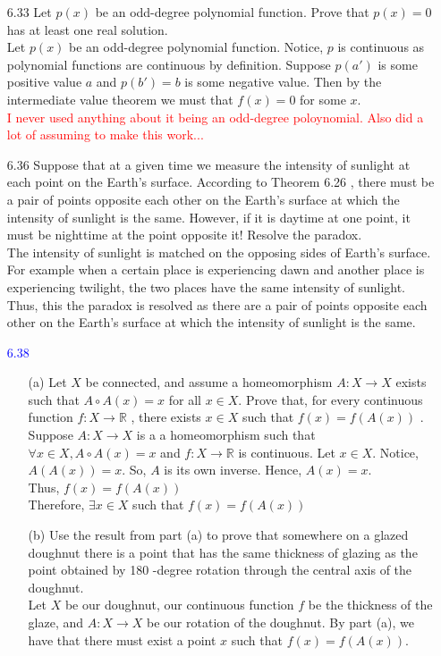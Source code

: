 \documentclass[12pt]{article}
\newcommand{\R}{\mathbb{R}}
\begin{document}
\begin{enumerate}
		\item[6.33] Let $p ( x )$ be an odd-degree polynomial function. Prove that $p ( x ) = 0$ has at least one real solution.\\
		Let $ p(x) $ be an odd-degree polynomial function. Notice, $ p $ is continuous as polynomial functions are continuous by definition. Suppose $ p(a') $ is some positive value $ a $ and $ p(b') = b $ is some negative value. Then by the intermediate value theorem we must that $ f(x)=0 $ for some $ x $.\\
		\textcolor{red}{I never used anything about it being an odd-degree poloynomial. Also did a lot of assuming to make this work...}
		
		\item[6.36] Suppose that at a given time we measure the intensity of sunlight at each point on the Earth's surface. According to Theorem 6.26 , there must be a pair of points
		opposite each other on the Earth's surface at which the intensity of sunlight is the same. However, if it is daytime at one point, it must be nighttime at the
		point opposite it! Resolve the paradox.\\
		The intensity of sunlight is matched on the opposing sides of Earth's surface. For example when a certain place is experiencing dawn and another place is experiencing twilight, the two places have the same intensity of sunlight. Thus, this the paradox is resolved as there are a pair of points opposite each other on the Earth's surface at which the intensity of sunlight is the same.
		
		\item[\textcolor{blue}{6.38}] \begin{enumerate}
			\item[(a)] Let $X$ be connected, and assume a homeomorphism $A : X \rightarrow X$ exists
			such that $A \circ A ( x ) = x$ for all $x \in X .$ Prove that, for every continuous
			function $f : X \rightarrow \mathbb { R }$ , there exists $x \in X$ such that $f ( x ) = f ( A ( x ) )$ .\\
			Suppose $ A:X\rightarrow X $ is a a homeomorphism such that $ \forall x \in X, A\circ A(x) =x$ and $ f:X\rightarrow \R $ is continuous. Let $ x\in X $. Notice, $ A(A(x))=x $. So, $ A $ is its own inverse. Hence, $ A(x)=x $.\\
			Thus, $ f(x)=f(A(x)) $\\
			Therefore, $ \exists x\in X $ such that $ f(x)=f(A(x)) $ 
			\item[(b)] Use the result from part (a) to prove that somewhere on a glazed doughnut
			there is a point that has the same thickness of glazing as the point obtained
			by 180 -degree rotation through the central axis of the doughnut. \\
			Let $ X $ be our doughnut, our continuous function $ f $ be the thickness of the glaze, and $ A: X \rightarrow X $ be our rotation of the doughnut. By part (a), we have that there must exist a point $ x $ such that $ f(x)=f(A(x)) $. 
		\end{enumerate}
		

\end{enumerate}
\end{document}
